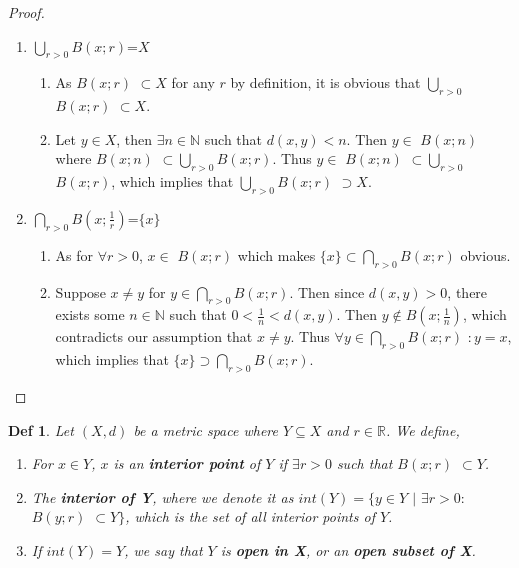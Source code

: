 \documentclass[paper=a4, fontsize=11pt]{scrartcl}
\newcommand{\ball}[2]{$B({#1};{#2})$}
\newtheorem{definition}{Def}
\begin{document}
\begin{proof}
$ $\newline
\vspace{-0.15in}
	\begin{enumerate}
 		\item $\bigcup\limits_{r>0}$\ball{x}{r}=$X$\\
		\begin{enumerate}[label=(\roman*)]
			\item As \ball{x}{r} $\subset X$ for any $r$ by definition, it is obvious that $\bigcup\limits_{r>0}$\ball{x}{r} $\subset X$.
			\item Let $y \in X$, then $\exists n \in \mathbb{N}$ such that $d(x,y) < n$. Then $y \in$ \ball{x}{n} where \ball{x}{n} $\subset \bigcup\limits_{r>0}$\ball{x}{r}. Thus $y \in$ \ball{x}{n} $\subset \bigcup\limits_{r>0}$\ball{x}{r}, which implies that $\bigcup\limits_{r>0}$\ball{x}{r} $\supset X$.\\
		\end{enumerate}
		\item $\bigcap\limits_{r>0}$\ball{x}{\frac{1}{r}}=$\{x\}$ \\
		\begin{enumerate}[label=(\roman*)]
			\item As for $\forall r > 0$, $x \in$ \ball{x}{r} which makes $\{x\} \subset \bigcap\limits_{r>0}$\ball{x}{r} obvious.
			\item Suppose $x \neq y$ for $y \in \bigcap\limits_{r>0}$\ball{x}{r}. Then since $d(x,y)>0$, there exists some $n\in \mathbb{N}$ such that $0<\frac{1}{n}<d(x,y)$. Then $y \notin$\ball{x}{\frac{1}{n}}, which contradicts our assumption that $x \neq y$. Thus $\forall y \in \bigcap\limits_{r>0}$\ball{x}{r} $:y=x$, which implies that $\{x\} \supset \bigcap\limits_{r>0}$\ball{x}{r}.
		\end{enumerate}
	\end{enumerate}
\end{proof}

\begin{definition}
	Let $(X,d)$ be a metric space where $Y \subseteq X$ and $r \in \mathbb{R}$. We define, 
	\begin{enumerate}
		\item For $x \in Y$, $x$ is an \textbf{interior point} of $Y$ if $\exists r > 0$ such that \ball{x}{r} $\subset Y$.
		\item The \textbf{interior of Y}, where we denote it as $int(Y)=\{y\in Y$ $|$ $\exists r > 0 :$ \ball{y}{r} $\subset Y \}$, which is the set of all interior points of $Y$.
		\item If $int(Y)=Y$, we say that $Y$ is \textbf{open in X}, or an \textbf{open subset of X}. \\ 
	\end{enumerate}
\end{definition}
\end{document}
